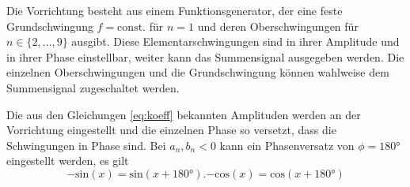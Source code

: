 Die Vorrichtung besteht aus einem Funktionsgenerator, der eine feste Grundschwingung $f=\mathup{const.}$ für $n=1$ und deren Oberschwingungen für $n\in\{2,...,9\}$ ausgibt.
Diese Elementarschwingungen sind in ihrer Amplitude und in ihrer Phase einstellbar, weiter kann das Summensignal ausgegeben werden.
Die einzelnen Oberschwingungen und die Grundschwingung können wahlweise dem Summensignal zugeschaltet werden.

Die aus den Gleichungen \ref{eq:koeff} bekannten Amplituden werden an der Vorrichtung eingestellt und die einzelnen Phase so versetzt, dass die Schwingungen in Phase sind.
Bei $a_n, b_n<0$ kann ein Phasenversatz von $\phi=180°$ eingestellt werden, es gilt
\begin{subequations}
	\begin{equation}
		-\mathup{sin}(x)=\mathup{sin}(x+180°).
	\end{equation}
	\begin{equation}
		-\mathup{cos}(x)=\mathup{cos}(x+180°)
	\end{equation}
\end{subequations}
